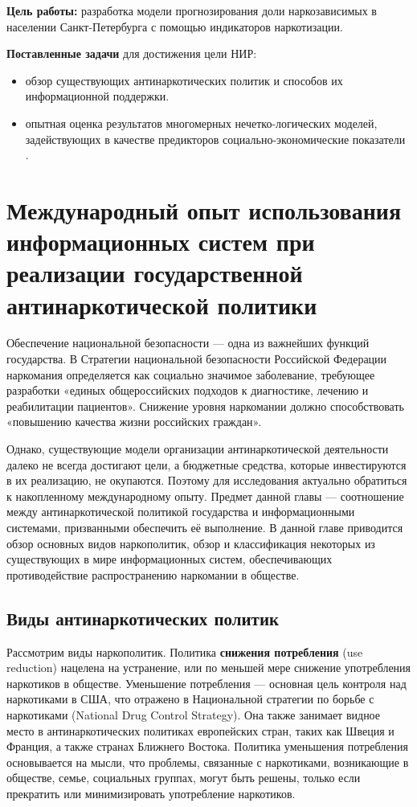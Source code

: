 \documentclass[a4paper,14pt]{article}
\begin{document}
\textbf{Цель работы:} разработка модели прогнозирования доли наркозависимых в населении Санкт-Петербурга с помощью индикаторов наркотизации.

\textbf{Поставленные задачи} для достижения цели НИР:
\begin{itemize}
	\item обзор существующих антинаркотических политик и способов их информационной поддержки.
	\item опытная оценка результатов многомерных нечетко-логических моделей, задействующих в качестве предикторов социально-экономические показатели .
\end{itemize} 



\newpage
\section{Международный опыт использования информационных систем при реализации государственной антинаркотической политики}

Обеспечение национальной безопасности — одна из важнейших функций государства. В Стратегии национальной безопасности Российской Федерации \cite{ru_nat_def_strat} наркомания определяется как социально значимое заболевание, требующее разработки «единых общероссийских подходов к диагностике, лечению и реабилитации пациентов». Снижение уровня наркомании должно способствовать «повышению качества жизни российских граждан».

Однако, существующие модели организации антинаркотической деятельности далеко не всегда достигают цели, а бюджетные средства, которые инвестируются в их реализацию, не окупаются. Поэтому для исследования актуально обратиться к накопленному международному опыту. Предмет данной главы — соотношение между антинаркотической политикой государства и информационными системами, призванными обеспечить её выполнение. В данной главе приводится обзор основных видов наркополитик, обзор и классификация некоторых из существующих в мире информационных систем, обеспечивающих противодействие распространению наркомании в обществе.

\subsection{Виды антинаркотических политик}

Рассмотрим виды наркополитик. Политика \textbf{снижения потребления} (use reduction) нацелена на устранение, или по меньшей мере снижение употребления наркотиков в обществе. Уменьшение потребления —  основная цель контроля над наркотиками в США, что отражено в Национальной стратегии по борьбе с наркотиками (National Drug Control Strategy)\cite{us_nat_drug_strat}. Она также занимает видное место в антинаркотических политиках европейских стран, таких как Швеция и Франция, а также странах Ближнего Востока. Политика уменьшения потребления основывается на мысли, что проблемы, связанные с наркотиками,  возникающие в обществе, семье, социальных группах, могут быть решены, только если прекратить или минимизировать употребление наркотиков. 
\end{document}
